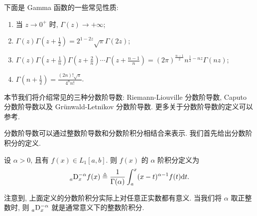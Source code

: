 \documentclass{ecnumaster}
\begin{document}
下面是 Gamma 函数的一些常见性质:
\begin{enumerate}
  \item 当 $z \to 0^+$ 时, $\Gamma (z) \to +\infty$;
  \item $\Gamma(z)\Gamma(z+\frac{1}{2})= 2^{1-2z}\sqrt{\pi} \Gamma(2z)$;
  \item $\Gamma(z)\Gamma(z+\frac{1}{n}) \Gamma(z +\frac{2}{n}) \cdots \Gamma (z + \frac{n-1}{n})
    = (2\pi)^{\frac{n-1}{2}} n^{\frac{1}{2} - nz} \Gamma(nz)$;
  \item $\Gamma (n + \frac{1}{2}) = \frac{(2n)! \sqrt{\pi}}{4^n n!}$.
\end{enumerate}




本节我们将介绍常见的三种分数阶导数:
Riemann-Liouville 分数阶导数,
Caputo 分数阶导数以及 Gr\"unwald-Letnikov 分数阶导数. 更多关于分数阶导数的定义可以参考\cite{OT14}.


分数阶导数可以通过整数阶导数和分数阶积分相结合来表示.
我们首先给出分数阶积分的定义.
\begin{definition}
  设 $\alpha > 0$, 且有 $f(x) \in L_1[a, b].$ 则 $f(x)$ 的 $\alpha$ 阶积分定义为
  \begin{equation}
    \prescript{}{a}{\mathrm{D}}_x^{-\alpha}f(x) \triangleq \frac{1}{\Gamma(\alpha)}\int_{a}^x(x - t)^{\alpha - 1}f(t)\mathrm{d}t.
  \end{equation}
\end{definition}
注意到, 上面定义的分数阶积分实际上对任意正实数都有意义.
当我们将 $\alpha$ 取正整数时, 则 $\prescript{}{a}{\mathrm{D}}_x^{-\alpha}$ 就是通常意义下的整数阶积分.
\end{document}

